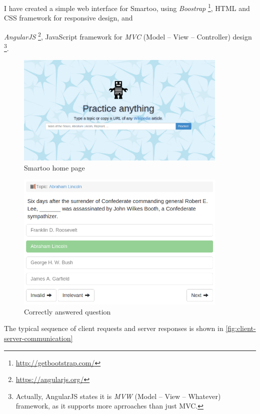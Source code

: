 \documentclass[a4paper, 12pt, twoside]{fithesis2}		%
\renewcommand{\_}{\leavevmode \kern0.0em\vbox{\hrule width0.4em}}
\begin{document}
I have created a simple web interface for Smartoo,
using \textit{Boostrap}%
\footnote{\url{http://getbootstrap.com/}},
HTML and CSS framework for responsive design,
and {\textit{AngularJS}%
\footnote{\url{https://angularjs.org/}},
JavaScript framework for \textit{MVC} (Model -- View -- Controller) design%
\footnote{Actually, AngularJS states it is \textit{MVW} (Model -- View -- Whatever) framework, as it supports more aprroaches than just MVC.}.

\begin{figure}[h]
  \centering
  \includegraphics[width=0.9\textwidth]{images/home-page.png}
  \caption{Smartoo home page}
  \label{fig:smartoo-home}
\end{figure}

\begin{figure}[h]
  \centering
  \includegraphics[width=0.9\textwidth]{images/answered-correctly.png}
  \caption{Correctly answered question}
  \label{fig:correctly-answered-question}
\end{figure}

The typical sequence of client requests and server responses is shown in
\autoref{fig:client-server-communication}

}
\end{document}
